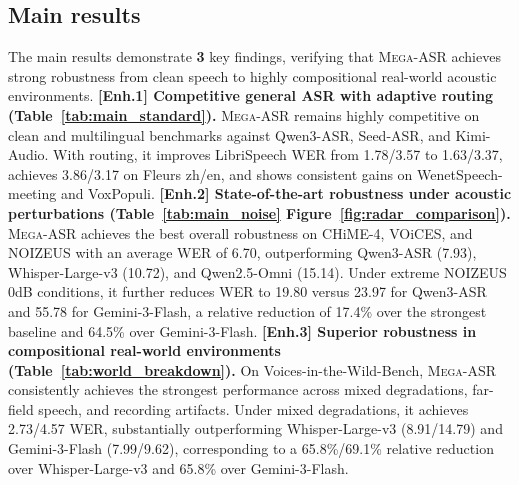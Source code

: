 \documentclass{article}
\begin{document}
\subsection{Main results}
The main results demonstrate \textbf{3} key findings, verifying that \textsc{Mega-ASR} achieves strong robustness from clean speech to highly compositional real-world acoustic environments. \textbf{[Enh.1] Competitive general ASR with adaptive routing (Table~\ref{tab:main_standard}).} \textsc{Mega-ASR} remains highly competitive on clean and multilingual benchmarks against Qwen3-ASR, Seed-ASR, and Kimi-Audio. With routing, it improves LibriSpeech WER from 1.78/3.57 to 1.63/3.37, achieves 3.86/3.17 on Fleurs zh/en, and shows consistent gains on WenetSpeech-meeting and VoxPopuli. \textbf{[Enh.2] State-of-the-art robustness under acoustic perturbations (Table~\ref{tab:main_noise} Figure~\ref{fig:radar_comparison}).} \textsc{Mega-ASR} achieves the best overall robustness on CHiME-4, VOiCES, and NOIZEUS with an average WER of 6.70, outperforming Qwen3-ASR (7.93), Whisper-Large-v3 (10.72), and Qwen2.5-Omni (15.14). Under extreme NOIZEUS 0dB conditions, it further reduces WER to 19.80 versus 23.97 for Qwen3-ASR and 55.78 for Gemini-3-Flash, a relative reduction of 17.4\% over the strongest baseline and 64.5\% over Gemini-3-Flash. \textbf{[Enh.3] Superior robustness in compositional real-world environments (Table~\ref{tab:world_breakdown}).} On Voices-in-the-Wild-Bench, \textsc{Mega-ASR} consistently achieves the strongest performance across mixed degradations, far-field speech, and recording artifacts. Under mixed degradations, it achieves 2.73/4.57 WER, substantially outperforming Whisper-Large-v3 (8.91/14.79) and Gemini-3-Flash (7.99/9.62), corresponding to a 65.8\%/69.1\% relative reduction over Whisper-Large-v3 and 65.8\% over Gemini-3-Flash.
\end{document}

